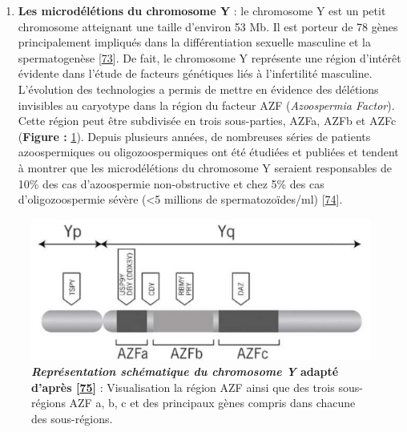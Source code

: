 \documentclass[12pt,a4paper,twoside]{ugathesis}
\providecommand{\tightlist}{%
  \setlength{\itemsep}{0pt}\setlength{\parskip}{0pt}}
\theoremstyle{definition}
\theoremstyle{definition}
\theoremstyle{definition}
\theoremstyle{remark}
\begin{document}
\begin{enumerate}
\def\labelenumi{\arabic{enumi}.}
\tightlist
\item
  \textbf{Les microdélétions du chromosome Y} : le chromosome Y est un
  petit chromosome atteignant une taille d'environ 53 Mb. Il est porteur
  de 78 gènes principalement impliqués dans la différentiation sexuelle
  masculine et la spermatogenèse
  {[}\protect\hyperlink{ref-Skaletsky2003}{73}{]}. De fait, le
  chromosome Y représente une région d'intérêt évidente dans l'étude de
  facteurs génétiques liés à l'infertilité masculine. L'évolution des
  technologies a permis de mettre en évidence des délétions invisibles
  au caryotype dans la région du facteur AZF (\emph{Azoospermia
  Factor}). Cette région peut être subdivisée en trois sous-parties,
  AZFa, AZFb et AZFc (\textbf{Figure :} \ref{fig:chry}). Depuis
  plusieurs années, de nombreuses séries de patients azoospermiques ou
  oligozoospermiques ont été étudiées et publiées et tendent à montrer
  que les microdélétions du chromosome Y seraient responsables de 10\%
  des cas d'azoospermie non-obstructive et chez 5\% des cas
  d'oligozoospermie sévère (\textless{}5 millions de spermatozoïdes/ml)
  {[}\protect\hyperlink{ref-Hotaling2014}{74}{]}.
\end{enumerate}

\newpage

\begin{figure}

{\centering \includegraphics[scale=.45]{figure/chromozomeY} 

}

\caption[Représentation schématique du chromosome Y]{\textbf{\emph{Représentation schématique du chromosome Y}
adapté d'après {[}\protect\hyperlink{ref-OFlynnOBrien2010}{75}{]}} :
Visualisation la région AZF ainsi que des trois sous-régions AZF a, b, c
et des principaux gènes compris dans chacune des sous-régions.}\label{fig:chry}
\end{figure}
\end{document}
